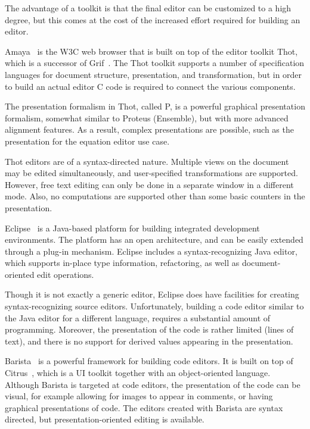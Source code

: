 \documentclass{speauth}
\begin{document}
The advantage of a toolkit is that the final editor can be customized to a high degree, but this comes at the cost of the increased effort required for building an editor. 


Amaya~\cite{amaya04} is the W3C web browser that is built on top of the editor toolkit Thot\cite{quint97thot}, which is a successor of Grif~\cite{quint86grif}. The Thot toolkit supports a number of specification languages for document structure, presentation, and transformation, but in order to build an actual editor C code is required to connect the various components.

The presentation formalism in Thot, called P, is a powerful graphical presentation formalism, somewhat similar to Proteus (Ensemble), but with more advanced alignment features. As a result, complex presentations are possible, such as the presentation for the equation editor use case.

Thot editors are of a syntax-directed nature. Multiple views on the document may be edited simultaneously, and user-specified transformations are supported. However, free text editing can only be done in a separate window in a different mode. Also, no computations are supported other than some basic counters in the presentation. 

\cbstart


Eclipse~\cite{eclipse2001} is a Java-based platform for building integrated development environments. The platform has an open architecture, and can be easily extended through a plug-in mechanism. Eclipse includes a syntax-recognizing Java editor, which supports in-place type information, refactoring, as well as document-oriented edit operations. 

Though it is not exactly a generic editor, Eclipse does have facilities for creating syntax-recognizing source editors. Unfortunately, building a code editor similar to the Java editor for a different language, requires a substantial amount of programming. Moreover, the presentation of the code is rather limited (lines of text), and there is no support for derived values appearing in the presentation.


Barista~\cite{KoMyers06Barista} is a powerful framework for building code editors. It is built on top of Citrus~\cite{KoMyers05Citrus}, which is a UI toolkit together with an object-oriented language. Although Barista is targeted at code editors, the presentation of the code can be visual, for example allowing for images to appear in comments, or having graphical presentations of code. The editors created with Barista are syntax directed, but presentation-oriented editing is available. 
\end{document}
